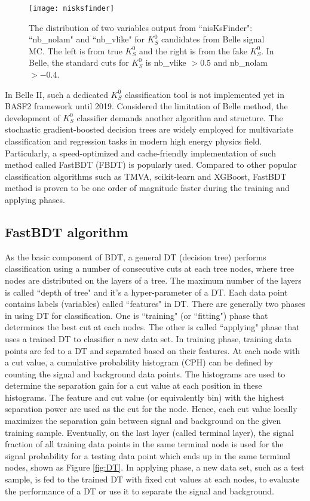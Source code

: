 \begin{figure}[htpb]
	\centering 
	\texttt{[image: nisksfinder]}
	\caption{The distribution of two variables output from ``nisKsFinder": ``nb\_nolam" and ``nb\_vlike" for $K_S^0$ candidates from Belle signal MC. The left is from true $K_S^0$ and the right is from the fake $K_S^0$. In Belle, the standard cuts for $K_S^0$ is nb\_vlike $> 0.5$ and nb\_nolam $> -0.4$\cite{kang2020measurement}.}
	\label{b1niskf}
\end{figure}


In Belle II, such a dedicated $K_S^0$ classification tool is not implemented yet in BASF2 framework until 2019. Considered the limitation of Belle method, the development of $K_S^0$ classifier demands another algorithm and structure. The stochastic gradient-boosted decision trees are widely employed for multivariate classification and regression tasks in modern high energy physics field. Particularly, a speed-optimized and cache-friendly
implementation of such method called FastBDT (FBDT) is popularly used\cite{keck2016fastbdt}. Compared to other popular classification algorithms such as TMVA, scikit-learn and XGBoost, FastBDT method is proven to be one order of magnitude faster during the training and applying phases\cite{keck2016fastbdt}. 


\subsection{FastBDT algorithm}
As the basic component of BDT, a general DT (decision tree) performs classification using a number of consecutive cuts at each tree nodes, where tree nodes are distributed on the layers of a tree. The maximum number of the layers is called ``depth of tree" and it's a hyper-parameter of a DT. Each data point contains labels (variables) called ``features" in DT. There are generally two phases in using DT for classification. One is ``training" (or ``fitting") phase that determines the best cut at each nodes. The other is called ``applying" phase that uses a trained DT to classifier a new data set. In training phase, training data points are fed to a DT and separated based on their features. At each node with a cut value, a cumulative probability histogram (CPH) can be defined by counting the signal and background data points. The histograms are used to determine the separation gain for a cut value at each position in these histograms. The feature and cut value (or
equivalently bin) with the highest separation power are used as the cut for the node. Hence, each cut value locally maximizes the separation gain between signal and background on the given
training sample. Eventually, on the last layer (called terminal layer), the signal fraction of all training data points in the same terminal node is used for the signal probability for a testing data point which ends up in the same terminal nodes, shown as Figure \ref{fig:DT}. In applying phase, a new data set, such as a test sample, is fed to the trained DT with fixed cut values at each nodes, to evaluate the performance of a DT or use it to separate the signal and background.

